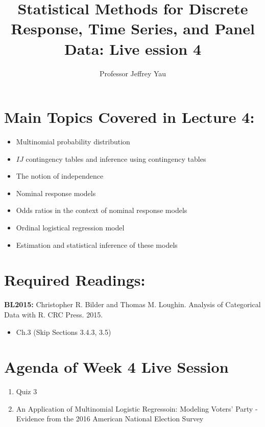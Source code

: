 \documentclass[]{article}
\title{Statistical Methods for Discrete Response, Time Series, and Panel Data:
Live ession 4}
\author{Professor Jeffrey Yau}
\date{}
\providecommand{\tightlist}{%
  \setlength{\itemsep}{0pt}\setlength{\parskip}{0pt}}
\begin{document}
\maketitle

\section{Main Topics Covered in Lecture
4:}\label{main-topics-covered-in-lecture-4}

\begin{itemize}
\tightlist
\item
  Multinomial probability distribution
\item
  \(IJ\) contingency tables and inference using contingency tables
\item
  The notion of independence
\item
  Nominal response models
\item
  Odds ratios in the context of nominal response models
\item
  Ordinal logistical regression model
\item
  Estimation and statistical inference of these models
\end{itemize}

\section{Required Readings:}\label{required-readings}

\textbf{BL2015:} Christopher R. Bilder and Thomas M. Loughin. Analysis
of Categorical Data with R. CRC Press. 2015.

\begin{itemize}
\tightlist
\item
  Ch.3 (Skip Sections 3.4.3, 3.5)
\end{itemize}

\section{Agenda of Week 4 Live
Session}\label{agenda-of-week-4-live-session}

\begin{enumerate}
\def\labelenumi{\arabic{enumi}.}
\item
  Quiz 3
\item
  An Application of Multinomial Logistic Regressoin: Modeling Voters'
  Party - Evidence from the 2016 American National Election Survey
\end{enumerate}
\end{document}
